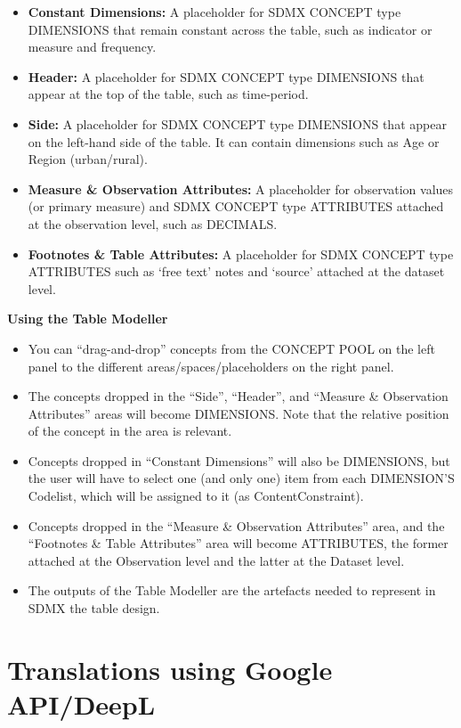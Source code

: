 \documentclass[
]{book}
\begin{document}
\begin{itemize}
\item
  \textbf{Constant Dimensions:} A placeholder for SDMX CONCEPT type DIMENSIONS that remain constant across the table, such as indicator or measure and frequency.
\item
  \textbf{Header:} A placeholder for SDMX CONCEPT type DIMENSIONS that appear at the top of the table, such as time-period.
\item
  \textbf{Side:} A placeholder for SDMX CONCEPT type DIMENSIONS that appear on the left-hand side of the table. It can contain dimensions such as Age or Region (urban/rural).
\item
  \textbf{Measure \& Observation Attributes:} A placeholder for observation values (or primary measure) and SDMX CONCEPT type ATTRIBUTES attached at the observation level, such as DECIMALS.
\item
  \textbf{Footnotes \& Table Attributes:} A placeholder for SDMX CONCEPT type ATTRIBUTES such as `free text' notes and `source' attached at the dataset level.
\end{itemize}

\textbf{Using the Table Modeller}

\begin{itemize}
\item
  You can ``drag-and-drop'' concepts from the CONCEPT POOL on the left panel to the different areas/spaces/placeholders on the right panel.
\item
  The concepts dropped in the ``Side'', ``Header'', and ``Measure \& Observation Attributes'' areas will become DIMENSIONS. Note that the relative position of the concept in the area is relevant.
\item
  Concepts dropped in ``Constant Dimensions'' will also be DIMENSIONS, but the user will have to select one (and only one) item from each DIMENSION'S Codelist, which will be assigned to it (as ContentConstraint).
\item
  Concepts dropped in the ``Measure \& Observation Attributes'' area, and the ``Footnotes \& Table Attributes'' area will become ATTRIBUTES, the former attached at the Observation level and the latter at the Dataset level.
\item
  The outputs of the Table Modeller are the artefacts needed to represent in SDMX the table design.
\end{itemize}

\hypertarget{translations-using-google-apideepl}{%
\section{Translations using Google API/DeepL}\label{translations-using-google-apideepl}}

  
\end{document}
